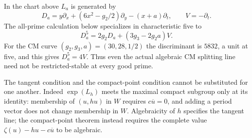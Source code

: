 \documentclass[11pt]{article}
\theoremstyle{definition}\newtheorem{definition}[theorem]{Definition}
\theoremstyle{remark}\newtheorem{remark}[theorem]{Remark}
\begin{document}
In the chart above $L_a$ is generated by
\[
 D_a=y\partial_x+(6x^2-g_2/2)\partial_y-(x+a)\partial_t,
 \qquad V=-\partial_t.
\]
The all-prime calculation below specializes in characteristic five to
\[
 D_a^5=2g_2D_a+(3g_3-2g_2a)V.
\]
For the CM curve $(g_2,g_3,a)=(30,28,1/2)$ the discriminant is $5832$, a unit at five, and this gives $D_a^5=4V$. Thus even the actual algebraic CM splitting line need not be restricted-stable at every good prime.

The tangent condition and the compact-point condition cannot be substituted for one another. Indeed $\exp(L_h)$ meets the maximal compact subgroup only at its identity: membership of $(u,hu)$ in $W$ requires $c\overline u=0$, and adding a period vector does not change membership in $W$. Algebraicity of $h$ specifies the tangent line; the compact-point theorem instead requires the complete value $\zeta(u)-hu-c\overline u$ to be algebraic.
\end{document}
